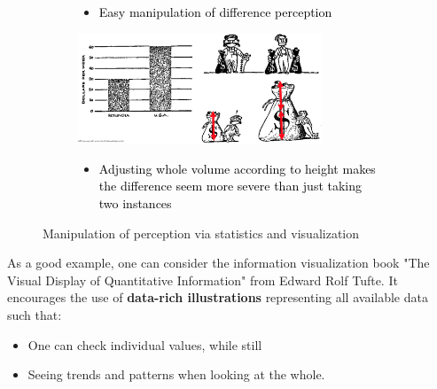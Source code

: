 \begin{figure}[h]
\begin{subfigure}{0.45\textwidth}
    \begin{itemize}
      \item \textcolor{black}{\small Easy manipulation of difference perception} 
    \end{itemize}
  \end{subfigure}

  \vspace*{0.5cm}
  \begin{subfigure}{0.7\textwidth}
    \centering
    \includegraphics[width=0.8\textwidth]{assets/visualization_and_extraction/lie/factor.png}
    \begin{itemize}
      \item \textcolor{black}{\small Adjusting whole volume according to height makes the difference seem more severe than just taking two instances} 
    \end{itemize}
  \end{subfigure}

  \caption{Manipulation of perception via statistics and visualization}
  \label{fig:2_manipulate_perception}
\end{figure}

As a good example, one can consider the information visualization book "The Visual Display of Quantitative Information" from Edward Rolf Tufte. It encourages the use of \textbf{data-rich illustrations} representing all available data such that:
\begin{itemize}
  \item One can check individual values, while still
  \item Seeing trends and patterns when looking at the whole.
\end{itemize}